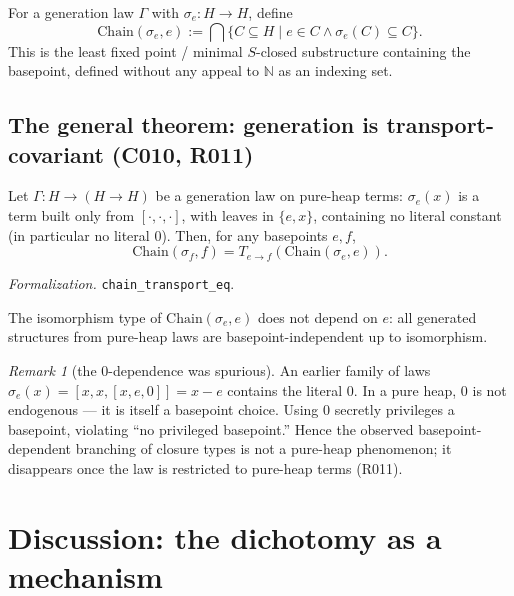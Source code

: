 \documentclass[sigplan,10pt,anonymous,review]{acmart}
\theoremstyle{remark}
\newtheorem{remark}{Remark}
\begin{document}
\begin{definition}\label{def:minclosure}
For a generation law $\Gamma$ with $\sigma_e : H \to H$, define
\[
\mathrm{Chain}(\sigma_e, e) := \bigcap \{ C \subseteq H \mid e \in C \land \sigma_e(C) \subseteq C \}.
\]
This is the least fixed point / minimal $S$-closed substructure containing the
basepoint, defined without any appeal to $\mathbb{N}$ as an indexing set.
\end{definition}

\subsection{The general theorem: generation is transport-covariant (C010, R011)}

\begin{theorem}\label{thm:R011}
Let $\Gamma : H \to (H \to H)$ be a generation law on pure-heap terms: $\sigma_e(x)$
is a term built only from $[\cdot,\cdot,\cdot]$, with leaves in $\{e, x\}$, containing
no literal constant (in particular no literal $0$). Then, for any basepoints $e, f$,
\[
\mathrm{Chain}(\sigma_f, f) = T_{e \to f}(\mathrm{Chain}(\sigma_e, e)).
\]
\end{theorem}
\emph{Formalization.} \texttt{chain\_transport\_eq}.

\begin{corollary}\label{cor:closure}
The isomorphism type of $\mathrm{Chain}(\sigma_e, e)$ does not depend on $e$: all
generated structures from pure-heap laws are basepoint-independent up to isomorphism.
\end{corollary}

\begin{remark}[the 0-dependence was spurious]\label{rem:zero}
An earlier family of laws $\sigma_e(x) = [x, x, [x, e, 0]] = x - e$ contains the
literal $0$. In a pure heap, $0$ is not endogenous --- it is itself a basepoint choice.
Using $0$ secretly privileges a basepoint, violating ``no privileged basepoint.''
Hence the observed basepoint-dependent branching of closure types is not a pure-heap
phenomenon; it disappears once the law is restricted to pure-heap terms (R011).
\end{remark}

\section{Discussion: the dichotomy as a mechanism}
\end{document}
